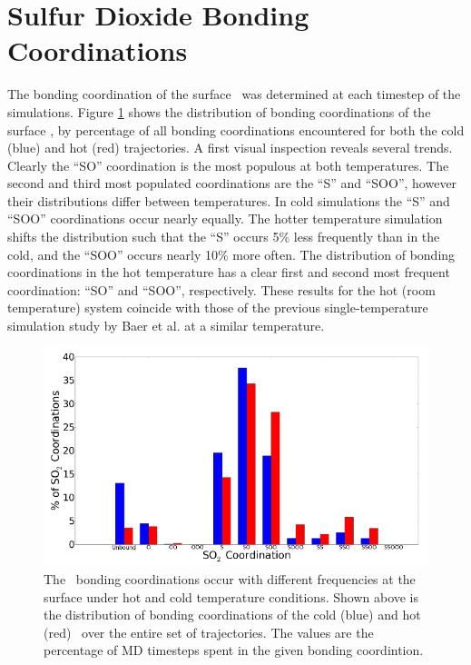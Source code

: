 \section {Sulfur Dioxide Bonding Coordinations}

The bonding coordination of the surface \suldiox~was determined at each timestep of the simulations. Figure \ref{fig:bonding-coordinations} shows the distribution of bonding coordinations of the surface \suldiox, by percentage of all bonding coordinations encountered for both the cold (blue) and hot (red) trajectories. A first visual inspection reveals several trends. Clearly the ``SO'' coordination is the most populous at both temperatures. The second and third most populated coordinations are the ``S'' and ``SOO'', however their distributions differ between temperatures. In cold simulations the ``S'' and ``SOO'' coordinations occur nearly equally. The hotter temperature simulation shifts the distribution such that the ``S'' occurs 5\% less frequently than in the cold, and the ``SOO'' occurs nearly 10\% more often. The distribution of bonding coordinations in the hot temperature has a clear first and second most frequent coordination: ``SO'' and ``SOO'', respectively. These results for the hot (room temperature) system coincide with those of the previous single-temperature simulation study by Baer et al. at a similar temperature.\cite{Baer2010}

\begin{figure}[h!]
	\begin{center}
		\includegraphics[scale=1.0]{images/coordinations/so2-coordinations-percents-small.png}
		\caption{The \suldiox~bonding coordinations occur with different frequencies at the surface under hot and cold temperature conditions. Shown above is the distribution of bonding coordinations of the cold (blue) and hot (red) \suldiox~over the entire set of trajectories. The values are the percentage of MD timesteps spent in the given bonding coordintion.}
		\label{fig:bonding-coordinations}
	\end{center}
\end{figure}

